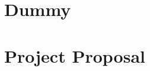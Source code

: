\documentclass[12pt,a4paper,twoside,openright]{report}
\begin{document}
%


\printbibliography[]
%

\appendix

\chapter{Dummy}

\chapter{Project Proposal}


\end{document}
